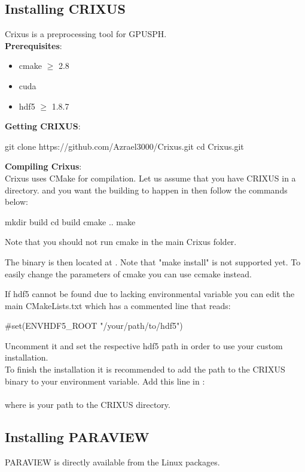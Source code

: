 \documentclass{../GPUSPHtemplate}
\begin{document}
\subsection{Installing CRIXUS}
Crixus is a preprocessing tool for GPUSPH. \\

\textbf{Prerequisites}:
\begin{itemize}
\item cmake $\ge$ 2.8
\item cuda
\item hdf5 $\ge$ 1.8.7
\end{itemize}

\textbf{Getting CRIXUS}:
\begin{shellcode}
git clone https://github.com/Azrael3000/Crixus.git
cd Crixus.git
\end{shellcode}

\textbf{Compiling Crixus}: \\
Crixus uses CMake for compilation. 
Let us assume that you have CRIXUS in a  directory. 
and you want the building to happen in  then follow the commands below:
\begin{shellcode}
mkdir build
cd build
cmake ..
make
\end{shellcode}
Note that you should not run cmake in the main Crixus folder.

The binary is then located at .
Note that "make install" is not supported yet. To easily change the parameters of cmake you can use ccmake instead.

If hdf5 cannot be found due to lacking environmental variable you can edit the main CMakeLists.txt which has a commented line that reads:
\begin{shellcode}
#set(ENV{HDF5_ROOT} "/your/path/to/hdf5")
\end{shellcode}
Uncomment it and set the respective hdf5 path in order to use your custom installation.\\

To finish the installation it is recommended to add the path to the CRIXUS binary to your
 environment variable. Add this line in :\\
\\
where  is your path to the CRIXUS directory.

\subsection{Installing PARAVIEW}

PARAVIEW is directly available from the Linux packages.

\newpage
\appendixpage
\appendix



\end{document}
